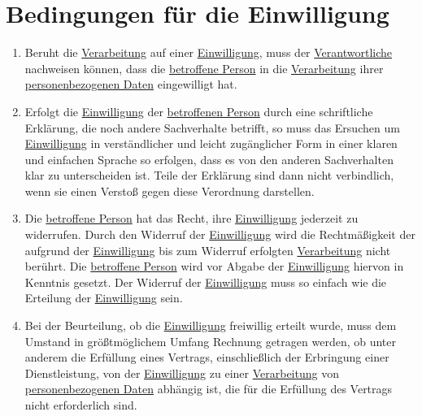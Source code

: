 \chapter{Bedingungen für die Einwilligung}
\label{ch:7}


\begin{enumerate}

  \item Beruht die \hyperref[itm:04-2]{Verarbeitung} auf einer \hyperref[itm:04-11]{Einwilligung}, muss der \hyperref
   [itm:04-7]{Verantwortliche} nachweisen können, dass die \hyperref[itm:04-1]{betroffene Person} in die \hyperref
   [itm:04-2]{Verarbeitung} ihrer \hyperref[itm:04-1]{personenbezogenen Daten} eingewilligt hat.
  \label{itm:07-1}

  \item Erfolgt die \hyperref[itm:04-11]{Einwilligung} der \hyperref[itm:04-1]{betroffenen Person} durch eine
   schriftliche Erklärung, die noch andere Sachverhalte betrifft, so muss das Ersuchen um \hyperref[itm:04-11]
   {Einwilligung} in verständlicher und leicht zugänglicher Form in einer klaren und einfachen Sprache so erfolgen,
   dass es von den anderen Sachverhalten klar zu unterscheiden ist. Teile der Erklärung sind dann nicht verbindlich,
   wenn sie einen Verstoß gegen diese Verordnung darstellen.
  \label{itm:07-2}

  \item Die \hyperref[itm:04-1]{betroffene Person} hat das Recht, ihre \hyperref[itm:04-11]{Einwilligung} jederzeit zu
   widerrufen. Durch den Widerruf der
   \hyperref[itm:04-11]{Einwilligung} wird die Rechtmäßigkeit der aufgrund der \hyperref[itm:04-11]{Einwilligung} bis
    zum Widerruf erfolgten \hyperref[itm:04-2]{Verarbeitung} nicht berührt. Die \hyperref[itm:04-1]{betroffene Person}
    wird vor Abgabe der \hyperref[itm:04-11]{Einwilligung} hiervon in Kenntnis gesetzt. Der Widerruf der
   \hyperref[itm:04-11]{Einwilligung} muss so einfach wie die Erteilung der \hyperref[itm:04-11]{Einwilligung} sein.
  \label{itm:07-3}

  \item Bei der Beurteilung, ob die \hyperref[itm:04-11]{Einwilligung} freiwillig erteilt wurde, muss dem Umstand in
   größtmöglichem Umfang Rechnung getragen werden, ob unter anderem die Erfüllung eines Vertrags, einschließlich der
   Erbringung einer Dienstleistung, von der \hyperref[itm:04-11]{Einwilligung} zu einer \hyperref[itm:04-2]
   {Verarbeitung} von \hyperref[itm:04-1]{personenbezogenen Daten} abhängig ist, die für die Erfüllung des Vertrags
   nicht erforderlich sind.
  \label{itm:07-4}

\end{enumerate}


